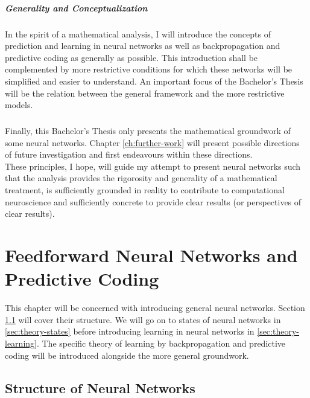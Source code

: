 \documentclass[a4paper,11pt]{report}
\begin{document}
\paragraph{Generality and Conceptualization}
In the spirit of a mathematical analysis, I will introduce the concepts of prediction and learning in neural networks as well as backpropagation and predictive coding as generally as possible. This introduction shall be complemented by more restrictive conditions for which these networks will be simplified and easier to understand. An important focus of the Bachelor's Thesis will be the relation between the general framework and the more restrictive models.
\paragraph{}
Finally, this Bachelor's Thesis only presents the mathematical groundwork of some neural networks. Chapter \ref{ch:further-work} will present possible directions of future investigation and first endeavours within these directions.\\
These principles, I hope, will guide my attempt to present neural networks such that the analysis provides the rigorosity and generality of a mathematical treatment, is sufficiently grounded in reality to contribute to computational neuroscience and sufficiently concrete to provide clear results (or perspectives of clear results).


\chapter{Feedforward Neural Networks and Predictive Coding}\label{ch:theory}

This chapter will be concerned with introducing general neural networks. Section \ref{sec:theory-structure} will cover their structure. We will go on to states of neural networks in \ref{sec:theory-states} before introducing learning in neural networks in \ref{sec:theory-learning}. The specific theory of learning by backpropagation and predictive coding will be introduced alongside the more general groundwork.

\section{Structure of Neural Networks}\label{sec:theory-structure}
\end{document}
